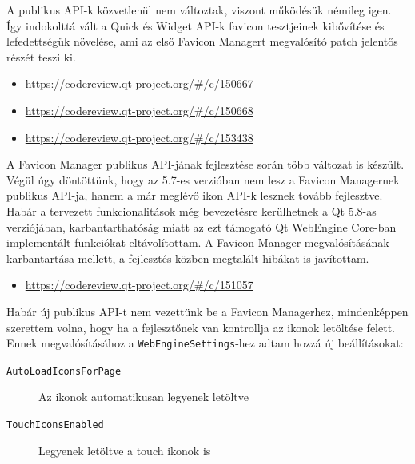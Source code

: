 \documentclass[12pt]{report}
\let\origurl\url
\renewcommand{\url}[1]{%
    \textcolor{blue}{\origurl{#1}}
}
\newcommand{\gerrit}[1]{%
    \textcolor{qtgreen}{\origurl{https://codereview.qt-project.org/\#/c/#1}}
}
\begin{document}
A publikus API-k közvetlenül nem változtak, viszont működésük némileg igen. Így indokolttá
vált a Quick és Widget API-k favicon tesztjeinek kibővítése és lefedettségük növelése, ami
az első Favicon Managert megvalósító patch jelentős részét teszi ki.

\begin{center}
    \begin{reviewbox}
        \begin{itemize}
            \renewcommand{\labelitemi}{\textcolor{qtgreen}{$\blacktriangleright$}}
            \item \gerrit{150667}
            \item \gerrit{150668}
            \item \gerrit{153438}
        \end{itemize}
    \end{reviewbox}
\end{center}

A Favicon Manager publikus API-jának fejlesztése során több változat is készült.
Végül úgy döntöttünk, hogy az 5.7-es verzióban nem lesz a Favicon Managernek publikus
API-ja, hanem a már meglévő ikon API-k lesznek tovább fejlesztve. Habár a tervezett
funkcionalitások még bevezetésre kerülhetnek a Qt 5.8-as verziójában, karbantarthatóság
miatt az ezt támogató Qt WebEngine Core-ban implementált funkciókat eltávolítottam.
A Favicon Manager megvalósításának karbantartása mellett, a fejlesztés közben megtalált
hibákat is javítottam.

\begin{center}
    \begin{reviewbox}
        \begin{itemize}
            \renewcommand{\labelitemi}{\textcolor{qtgreen}{$\blacktriangleright$}}
            \item \gerrit{151057}
        \end{itemize}
    \end{reviewbox}
\end{center}

Habár új publikus API-t nem vezettünk be a Favicon Managerhez, mindenképpen szerettem volna,
hogy ha a fejlesztőnek van kontrollja az ikonok letöltése felett. Ennek megvalósításához
a \texttt{WebEngineSettings}-hez adtam hozzá új beállításokat:
\begin{description}
    \item[\texttt{AutoLoadIconsForPage}] Az ikonok automatikusan legyenek letöltve
    \item[\texttt{TouchIconsEnabled}] Legyenek letöltve a touch ikonok is
\end{description}
\end{document}
